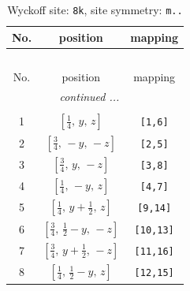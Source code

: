 \documentclass[fleqn,8pt]{jsarticle}
\begin{document}
\begin{longtable}{ccc}
\caption{Wyckoff site: {\tt 8k}, site symmetry: {\tt m..}}
 \\
 \hline \hline
No. & position & mapping \\ \hline \endfirsthead

\multicolumn{2}{l}{\tablename\ \thetable{}} \\
 \hline \hline
No. & position & mapping \\ \hline \endhead

 \hline \hline
\multicolumn{2}{r}{\footnotesize\it continued ...} \\ \endfoot

 \hline \hline
\multicolumn{2}{r}{} \\ \endlastfoot

1 & $\left[ \frac{1}{4},\, y,\, z \right]$ & {\tt [1,6]} \\ \hline
2 & $\left[ \frac{3}{4},\, - y,\, - z \right]$ & {\tt [2,5]} \\ \hline
3 & $\left[ \frac{3}{4},\, y,\, - z \right]$ & {\tt [3,8]} \\ \hline
4 & $\left[ \frac{1}{4},\, - y,\, z \right]$ & {\tt [4,7]} \\ \hline
5 & $\left[ \frac{1}{4},\, y + \frac{1}{2},\, z \right]$ & {\tt [9,14]} \\ \hline
6 & $\left[ \frac{3}{4},\, \frac{1}{2} - y,\, - z \right]$ & {\tt [10,13]} \\ \hline
7 & $\left[ \frac{3}{4},\, y + \frac{1}{2},\, - z \right]$ & {\tt [11,16]} \\ \hline
8 & $\left[ \frac{1}{4},\, \frac{1}{2} - y,\, z \right]$ & {\tt [12,15]} \\
\end{longtable}
\renewcommand{\arraystretch}{1.2}
\end{document}
